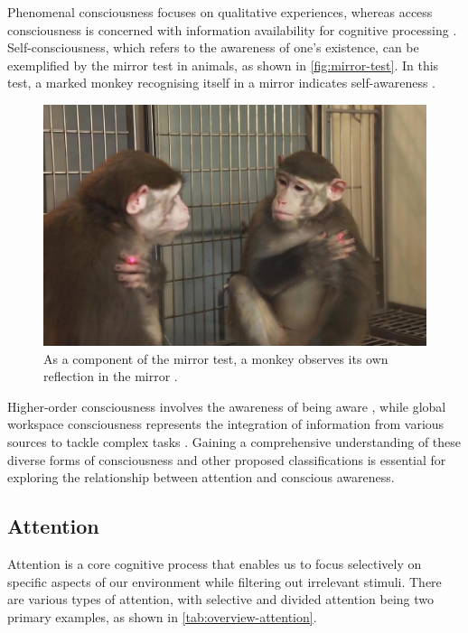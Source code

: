 \documentclass[10pt]{article}
\begin{document}
\begin{sloppypar}
  Phenomenal consciousness focuses on qualitative experiences, whereas access consciousness is concerned with information availability for cognitive processing \citep{aru_phenomenal_2013,block_two_2005}. Self-consciousness, which refers to the awareness of one’s existence, can be exemplified by the mirror test in animals, as shown in \autoref{fig:mirror-test}. In this test, a marked monkey recognising itself in a mirror indicates self-awareness \citep{chang_mirror-induced_2015}.

  \begin{figure}[ht]
    \centering
    \includegraphics[width=\textwidth]{figures/mirror.jpg}
    \caption[As a component of the mirror test, a monkey observes its own reflection in the mirror
    ]{As a component of the mirror test, a monkey observes its own reflection in the mirror \citep{chang_mirror-induced_2015}.}
    \label{fig:mirror-test}
  \end{figure}

  Higher-order consciousness involves the awareness of being aware \citep{carruthers_higher-order_2020}, while global workspace consciousness represents the integration of information from various sources to tackle complex tasks \citep{baars_essential_1997}. Gaining a comprehensive understanding of these diverse forms of consciousness and other proposed classifications is essential for exploring the relationship between attention and conscious awareness.

  \subsection{Attention}
  \label{sec:attention}

  Attention is a core cognitive process that enables us to focus selectively on specific aspects of our environment while filtering out irrelevant stimuli. There are various types of attention, with selective \citep{koivisto_relationship_2009} and divided attention \citep{mckanna_divided_2009} being two primary examples, as shown in \autoref{tab:overview-attention}.


\end{sloppypar}
\end{document}
